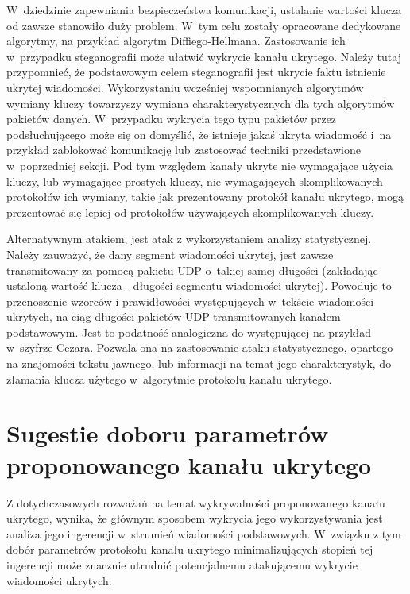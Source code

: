 \documentclass[a4paper, twoside, openright, 12pt]{report}
\begin{document}
       W~dziedzinie zapewniania bezpieczeństwa komunikacji, ustalanie wartości
       klucza od zawsze stanowiło duży problem. W~tym celu zostały opracowane
       dedykowane algorytmy, na przykład algorytm Diffiego-Hellmana. Zastosowanie
       ich w~przypadku steganografii może ułatwić wykrycie kanału ukrytego. Należy tutaj przypomnieć,
       że podstawowym celem steganografii jest ukrycie faktu istnienie ukrytej wiadomości.
       Wykorzystaniu wcześniej wspomnianych algorytmów wymiany kluczy towarzyszy
       wymiana charakterystycznych dla tych algorytmów pakietów danych. W~przypadku
       wykrycia tego typu pakietów przez podsłuchującego może się on domyślić,
       że istnieje jakaś ukryta wiadomość i~na przykład zablokować komunikację lub
       zastosować techniki przedstawione w~poprzedniej sekcji. Pod tym względem
       kanały ukryte nie wymagające użycia kluczy, lub wymagające prostych kluczy,
       nie wymagających skomplikowanych protokołów ich wymiany, takie jak prezentowany
       protokół kanału ukrytego, mogą prezentować
       się lepiej od protokołów używających skomplikowanych kluczy.

       Alternatywnym atakiem, jest atak z wykorzystaniem analizy statystycznej.
       Należy zauważyć, że dany segment wiadomości ukrytej, jest zawsze transmitowany
       za pomocą pakietu UDP o~takiej samej długości (zakładając ustaloną wartość klucza -
       długości segmentu wiadomości ukrytej). Powoduje to przenoszenie wzorców i
       prawidłowości występujących w~tekście wiadomości ukrytych, na ciąg długości
       pakietów UDP transmitowanych kanałem podstawowym. Jest to podatność analogiczna
       do występującej na przykład w~szyfrze Cezara. Pozwala ona na zastosowanie
       ataku statystycznego, opartego na znajomości tekstu jawnego, lub informacji
       na temat jego charakterystyk, do złamania klucza użytego w~algorytmie protokołu
       kanału ukrytego.

    \section{Sugestie doboru parametrów proponowanego kanału ukrytego} \label{SUGESTIEPARAMETROW}
       Z dotychczasowych rozważań na temat wykrywalności proponowanego kanału ukrytego, wynika,
       że głównym sposobem wykrycia jego wykorzystywania jest analiza jego ingerencji
       w~strumień wiadomości podstawowych. W~związku z tym dobór parametrów protokołu
       kanału ukrytego minimalizujących stopień
       tej ingerencji może znacznie utrudnić potencjalnemu atakującemu wykrycie
       wiadomości ukrytych.
\end{document}
